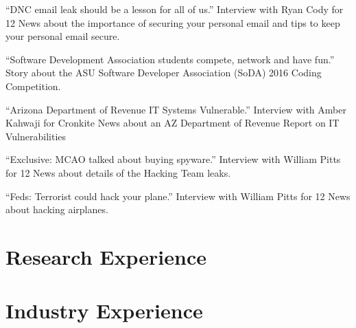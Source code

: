 \documentclass[11pt,letterpaper,sans]{moderncv}
\begin{document}
 {``DNC email leak should be a lesson for all
  of us.'' Interview with Ryan Cody for 12 News about the importance of securing your personal email and tips to keep your personal email secure.}

 {``Software Development Association students
  compete, network and have fun.'' Story about the ASU Software Developer Association (SoDA) 2016 Coding Competition.}

 {``Arizona Department of Revenue IT Systems
  Vulnerable.'' Interview with Amber Kahwaji for Cronkite News about an AZ Department of Revenue Report on IT Vulnerabilities}

 {``Exclusive: MCAO talked about buying
  spyware.'' Interview with William Pitts for 12 News about details of the Hacking Team leaks.}

 {``Feds: Terrorist could hack your plane.'' Interview with William Pitts for 12 News about hacking airplanes.}



\section{Research Experience}



\section{Industry Experience}


 {}{}


\end{document}
